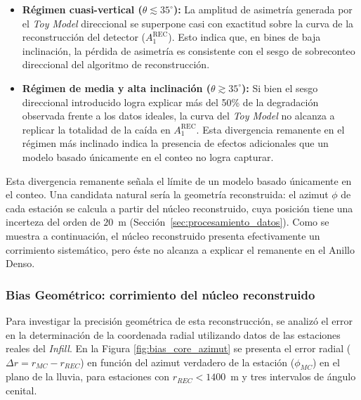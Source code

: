 \begin{itemize}
	\item \textbf{Régimen cuasi-vertical ($\theta \lesssim 35^\circ$):} La amplitud de asimetría generada por el \textit{Toy Model} direccional se superpone casi con exactitud sobre la curva de la reconstrucción del detector ($A_1^{\mathrm{REC}}$). Esto indica que, en bines de baja inclinación, la pérdida de asimetría es consistente con el sesgo de sobreconteo direccional del algoritmo de reconstrucción.
	\item \textbf{Régimen de media y alta inclinación ($\theta \gtrsim 35^\circ$):} Si bien el sesgo direccional introducido logra explicar más del 50\% de la degradación observada frente a los datos ideales, la curva del \textit{Toy Model} no alcanza a replicar la totalidad de la caída en $A_1^{\mathrm{REC}}$. Esta divergencia remanente en el régimen más inclinado indica la presencia de efectos adicionales que un modelo basado únicamente en el conteo no logra capturar. 
\end{itemize}

Esta divergencia remanente señala el límite de un modelo basado únicamente en el conteo. Una candidata natural sería la geometría reconstruida: el azimut $\phi$ de cada estación se calcula a partir del núcleo reconstruido, cuya posición tiene una incerteza del orden de $20$~m (Sección~\ref{sec:procesamiento_datos}). Como se muestra a continuación, el núcleo reconstruido presenta efectivamente un corrimiento sistemático, pero éste no alcanza a explicar el remanente en el Anillo Denso.

\subsubsection{Bias Geométrico: corrimiento del núcleo reconstruido}
\label{subsubsec:corrimiento_nucleo}

Para investigar la precisión geométrica de esta reconstrucción, se analizó el error en la determinación de la coordenada radial utilizando datos de las estaciones reales del \textit{Infill}. En la Figura \ref{fig:bias_core_azimut} se presenta el error radial ($\Delta r = r_{MC} - r_{REC}$) en función del azimut verdadero de la estación ($\phi_{MC}$) en el plano de la lluvia, para estaciones con $r_{REC} < 1400$~m y tres intervalos de ángulo cenital.

